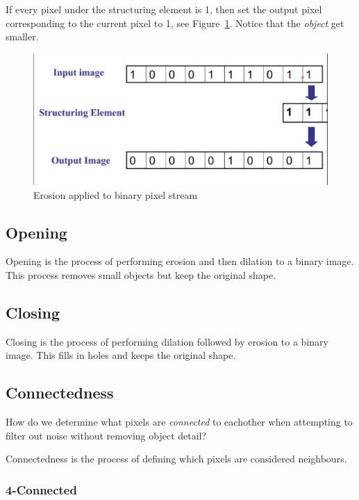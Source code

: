 \documentclass{article}
\begin{document}
If every pixel under the structuring element is 1, then set the output pixel corresponding to the current pixel to 1, see Figure~\ref{fig:erosion-eg2}. Notice that the \textit{object} get smaller.

\begin{figure}[ht]
  \centering
  \includegraphics[scale=0.2]{figures/l3-6.png}
  \caption{\label{fig:erosion-eg2} Erosion applied to binary pixel stream}
\end{figure}

\subsection{Opening}

Opening is the process of performing erosion and then dilation to a binary image. This process removes small objects but keep the original shape.

\subsection{Closing}

Closing is the process of performing dilation followed by erosion to a binary image. This fills in holes and keeps the original shape.

\subsection{Connectedness}
\label{subsec:connectedness}

How do we determine what pixels are \textit{connected} to eachother when attempting to filter out noise without removing object detail?

Connectedness is the process of defining which pixels are considered neighbours.

\subsubsection{4-Connected}
\end{document}
